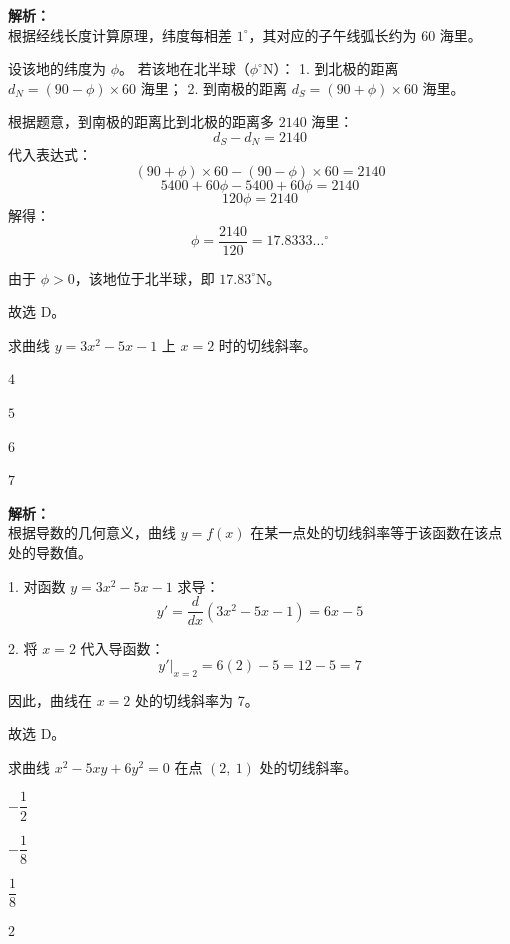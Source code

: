 \documentclass[12pt,a4paper]{exam-zh}
\begin{document}
\begin{solution}
    \textbf{解析：} \\
    根据经线长度计算原理，纬度每相差 $1^\circ$，其对应的子午线弧长约为 $60$ 海里。
    
    设该地的纬度为 $\phi$。
    若该地在北半球（$\phi^\circ\text{N}$）：
    1. 到北极的距离 $d_N = (90 - \phi) \times 60$ 海里；
    2. 到南极的距离 $d_S = (90 + \phi) \times 60$ 海里。
    
    根据题意，到南极的距离比到北极的距离多 $2140$ 海里：
    \[ d_S - d_N = 2140 \]
    代入表达式：
    \[ (90 + \phi) \times 60 - (90 - \phi) \times 60 = 2140 \]
    \[ 5400 + 60\phi - 5400 + 60\phi = 2140 \]
    \[ 120\phi = 2140 \]
    解得：
    \[ \phi = \frac{2140}{120} = 17.8333\dots^\circ \]
    
    由于 $\phi > 0$，该地位于北半球，即 $17.83^\circ\text{N}$。
    
    故选 D。
\end{solution}

\begin{question}
    求曲线 $y=3x^2-5x-1$ 上 $x=2$ 时的切线斜率。
    \begin{choices}
        \item $4$
        \item $5$
        \item $6$
        \item $7$
    \end{choices}
\end{question}

\begin{solution}
    \textbf{解析：} \\
    根据导数的几何意义，曲线 $y=f(x)$ 在某一点处的切线斜率等于该函数在该点处的导数值。
    
    1. 对函数 $y = 3x^2 - 5x - 1$ 求导：
    \[ y' = \frac{d}{dx}(3x^2 - 5x - 1) = 6x - 5 \]
    
    2. 将 $x=2$ 代入导函数：
    \[ y' \Big|_{x=2} = 6(2) - 5 = 12 - 5 = 7 \]
    
    因此，曲线在 $x=2$ 处的切线斜率为 7。
    
    故选 D。
\end{solution}

\begin{question}
    求曲线 $x^2 - 5xy + 6y^2 = 0$ 在点 $(2,\ 1)$ 处的切线斜率。\paren[C]
    \begin{choices}
        \item $-\dfrac{1}{2}$ \item $-\dfrac{1}{8}$ \item $\dfrac{1}{8}$ \item $2$
    \end{choices}
\end{question}
\end{document}
